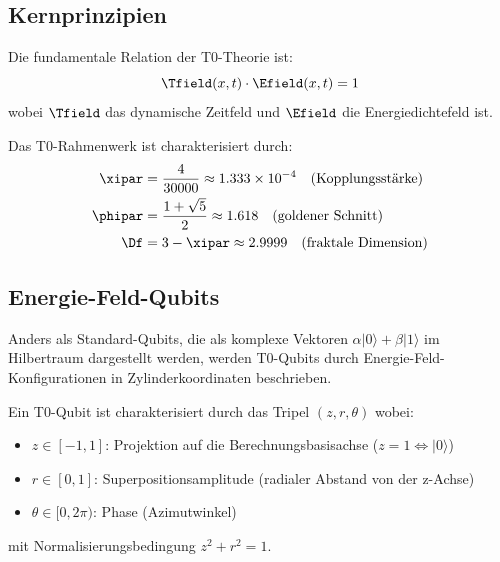 \subsection{Kernprinzipien}

\begin{definition}
	Die fundamentale Relation der T0-Theorie ist:
	\begin{equation}
		\Tfield(x,t) \cdot \Efield(x,t) = 1
		\label{eq:t0duality}
	\end{equation}
	wobei $\Tfield$ das dynamische Zeitfeld und $\Efield$ die Energiedichtefeld ist.
\end{definition}

\begin{definition}
	Das T0-Rahmenwerk ist charakterisiert durch:
	\begin{align}
		\xipar &= \frac{4}{30000} \approx 1.333 \times 10^{-4} \quad \text{(Kopplungsstärke)} \\
		\phipar &= \frac{1 + \sqrt{5}}{2} \approx 1.618 \quad \text{(goldener Schnitt)} \\
		\Df &= 3 - \xipar \approx 2.9999 \quad \text{(fraktale Dimension)}
	\end{align}
\end{definition}

\subsection{Energie-Feld-Qubits}

Anders als Standard-Qubits, die als komplexe Vektoren $\alpha|0\rangle + \beta|1\rangle$ im Hilbertraum dargestellt werden, werden T0-Qubits durch Energie-Feld-Konfigurationen in Zylinderkoordinaten beschrieben.

\begin{definition}[T0 Qubit]
	Ein T0-Qubit ist charakterisiert durch das Tripel $(z, r, \theta)$ wobei:
	\begin{itemize}
		\item $z \in [-1, 1]$: Projektion auf die Berechnungsbasisachse ($z=1 \Leftrightarrow |0\rangle$)
		\item $r \in [0, 1]$: Superpositionsamplitude (radialer Abstand von der z-Achse)
		\item $\theta \in [0, 2\pi)$: Phase (Azimutwinkel)
	\end{itemize}
	mit Normalisierungsbedingung $z^2 + r^2 = 1$.
\end{definition}

